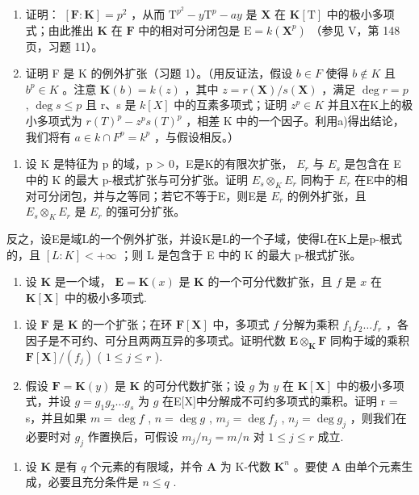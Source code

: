 \begin{enumerate}
\def\labelenumi{\alph{enumi})}
\item
  证明： \([\mathbf{F}:\mathbf{K}] = p^2\) ，从而 \(\mathrm{T}^{p^2} - y\mathrm{T}^p - ay\) 是 \(\mathbf{X}\) 在 \(\mathbf{K}[\mathrm{T}]\) 中的极小多项式；由此推出 \(\mathbf{K}\) 在 \(\mathbf{F}\) 中的相对可分闭包是 \(\mathrm{E} = k(\mathbf{X}^p)\) （参见 V，第 148 页，习题 11）。
\item
  证明 F 是 K 的例外扩张（习题 1）。（用反证法，假设 \(b \in F\) 使得 \(b \notin K\) 且 \(b^{p} \in K\) 。注意 \(\mathbf{K}(b) = k(z)\) ，其中 \(z = r(\mathbf{X}) / s(\mathbf{X})\) ，满足 \(\deg r = p\) , \(\deg s \leqslant p\) 且 r、s 是 \(k[X]\) 中的互素多项式；证明 \(z^{p} \in K\) 并且X在K上的极小多项式为 \(r(T)^{p} - z^{p}s(T)^{p}\) ，相差 K 中的一个因子。利用a)得出结论，我们将有 \(a \in k \cap F^{p} = k^{p}\) ，与假设相反。）
\end{enumerate}

\begin{enumerate}
\def\labelenumi{\arabic{enumi})}
\setcounter{enumi}{2}
\tightlist
\item
  设 K 是特征为 p 的域，p \textgreater{} 0，E是K的有限次扩张， \(E_{r}\) 与 \(E_{s}\) 是包含在 E 中的 K 的最大 p-根式扩张与可分扩张。证明 \(E_{s} \otimes_{K} E_{r}\) 同构于 \(E_{r}\) 在E中的相对可分闭包，并与之等同；若它不等于E，则E是 \(E_{r}\) 的例外扩张，且 \(E_{s} \otimes_{K} E_{r}\) 是 \(E_{r}\) 的强可分扩张。
\end{enumerate}

反之，设E是域L的一个例外扩张，并设K是L的一个子域，使得L在K上是p-根式的，且 \([L:K]<+\infty\) ；则 L 是包含于 E 中的 K 的最大 p-根式扩张。

\begin{enumerate}
\def\labelenumi{\arabic{enumi})}
\setcounter{enumi}{3}
\tightlist
\item
  设 \(\mathbf{K}\) 是一个域， \(\mathbf{E} = \mathbf{K}(x)\) 是 \(\mathbf{K}\) 的一个可分代数扩张，且 \(f\) 是 \(x\) 在 \(\mathbf{K}[\mathbf{X}]\) 中的极小多项式.
\end{enumerate}

\begin{enumerate}
\def\labelenumi{\alph{enumi})}
\item
  设 \(\mathbf{F}\) 是 \(\mathbf{K}\) 的一个扩张；在环 \(\mathbf{F}[\mathbf{X}]\) 中，多项式 \(f\) 分解为乘积 \(f_{1}f_{2}\ldots f_{r}\) ，各因子是不可约、可分且两两互异的多项式。证明代数 \(\mathbf{E} \otimes_{\mathbf{K}} \mathbf{F}\) 同构于域的乘积 \(\mathbf{F}[\mathbf{X}] / (f_j)\) ( \(1 \leqslant j \leqslant r\) ).
\item
  假设 \(\mathbf{F} = \mathbf{K}(y)\) 是 \(\mathbf{K}\) 的可分代数扩张；设 \(g\) 为 \(y\) 在 \(\mathbf{K}[\mathbf{X}]\) 中的极小多项式，并设 \(g = g_1g_2\ldots g_s\) 为 \(g\) 在E{[}X{]}中分解成不可约多项式的乘积。证明 r = s，并且如果 \(m = \deg f\) , \(n = \deg g\) , \(m_j = \deg f_j\) , \(n_j = \deg g_j\) ，则我们在必要时对 \(g_j\) 作置换后，可假设 \(m_j / n_j = m / n\) 对 \(1 \leq j \leq r\) 成立.
\end{enumerate}

\begin{enumerate}
\def\labelenumi{\arabic{enumi})}
\setcounter{enumi}{4}
\tightlist
\item
  设 \(\mathbf{K}\) 是有 \(q\) 个元素的有限域，并令 \(\mathbf{A}\) 为 K-代数 \(\mathbf{K}^n\) 。要使 \(\mathbf{A}\) 由单个元素生成，必要且充分条件是 \(n \leqslant q\) .
\end{enumerate}

